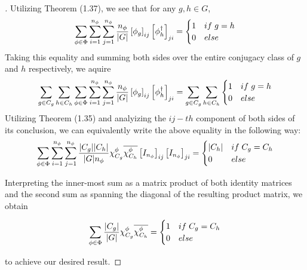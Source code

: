 \documentclass[10pt]{ucthesis}
\begin{document}
\noindent \begin{proof}[\cite{Tung}] Utilizing Theorem (1.37), we see that for any $g, h \in G$, $$\sum_{\phi \in \Phi} \sum_{i=1}^{n_\phi} \sum_{j=1}^{n_\phi} \frac{n_\phi}{|G|} \left[\phi_g\right]_{ij}\left[\phi_{h}^\dag\right]_{ji} = \begin{cases}
																										1 & if \hspace{1mm} g = h \\
																										0 & else
																									\end{cases}$$
Taking this equality and summing both sides over the entire conjugacy class of $g$ and $h$ respectively, we aquire
\begin{equation}
	\begin{aligned}
		\sum_{g \in C_g} \sum_{h\in C_h} \sum_{\phi \in \Phi} \sum_{i=1}^{n_\phi} \sum_{j=1}^{n_\phi} \frac{n_\phi}{|G|} \left[\phi_g\right]_{ij}\left[\phi_{h}^\dag\right]_{ji} = \sum_{g \in C_g} \sum_{h\in C_h} \begin{cases}
																										1 & if \hspace{1mm} g = h \\
																										0 & else
																									\end{cases}
	\end{aligned}
\end{equation}
Utilizing Theorem (1.35) and analyizing the $ij-th$ component of both sides of its conclusion, we can equivalently write the above equality in the following way:
\begin{equation}
	\begin{aligned}
		 \sum_{\phi \in \Phi} \sum_{i=1}^{n_\phi} \sum_{j=1}^{n_\phi} \frac{|C_g||C_h|}{|G|n_\phi}\chi^\phi_{C_g}\overline{\chi^\phi_{C_h}} \left[I_{n_\phi}\right]_{ij}\left[I_{n_\phi}\right]_{ji} = \begin{cases}
																										|C_h| & if \hspace{1mm} C_g = C_h \\
																										0 & else
																									\end{cases}
	\end{aligned}
\end{equation}

Interpreting the inner-most sum as a matrix product of both identity matrices and the second sum as spanning the diagonal of the resulting product matrix, we obtain

\begin{equation}
	\begin{aligned}
		 \sum_{\phi \in \Phi} \frac{|C_g|}{|G|}\chi^\phi_{C_g}\overline{\chi^\phi_{C_h}} = \begin{cases}
																										1 & if \hspace{1mm} C_g = C_h \\
																										0 & else
																									\end{cases}
	\end{aligned}
\end{equation}

to achieve our desired result.  \end{proof}
\end{document}
